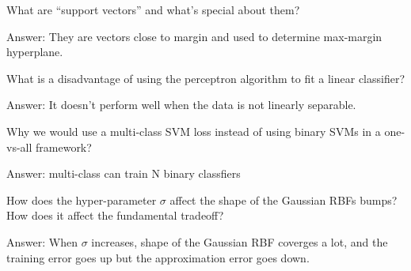 \documentclass{article}
\def\ans#1{\par\gre{Answer: #1}}
\def\gre#1{{\color{gre}#1}}
\begin{document}
{\item What are ``support vectors'' and what's special about them?
\ans{They are vectors close to margin and used to determine max-margin hyperplane.}
\item What is a disadvantage of using the perceptron algorithm to fit a linear classifier?
\ans{It doesn't perform well when the data is not linearly separable.}
\item Why we would use a multi-class SVM loss instead of using binary SVMs in a one-vs-all framework?
\ans{multi-class can train N binary classfiers}
\item How does the hyper-parameter $\sigma$ affect the shape of the Gaussian RBFs bumps? How does it affect the fundamental tradeoff?
\ans{When $\sigma$ increases, shape of the Gaussian RBF coverges a lot, and the training error goes up but the approximation error goes down.}
}
\end{document}
